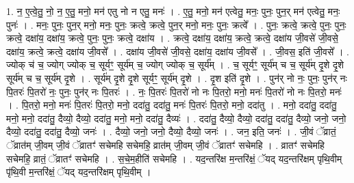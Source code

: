 \documentclass[17pt]{extarticle}
\begin{document}
1. न॒ ए॒त्वे॒तु॒ नो॒ न॒ ए॒तु॒ मनो॒ मन॑ एतु नो न एतु॒ मनः॑ । . ए॒तु॒ मनो॒ मन॑ एत्वेतु॒ मनः॒ पुनः॒ पुन॒र् मन॑ एत्वेतु॒ मनः॒ पुनः॑ । . मनः॒ पुनः॒ पुन॒र् मनो॒ मनः॒ पुनः॒ क्रत्वे॒ क्रत्वे॒ पुन॒र् मनो॒ मनः॒ पुनः॒ क्रत्वे᳚ । . पुनः॒ क्रत्वे॒ क्रत्वे॒ पुनः॒ पुनः॒ क्रत्वे॒ दक्षा॑य॒ दक्षा॑य॒ क्रत्वे॒ पुनः॒ पुनः॒ क्रत्वे॒ दक्षा॑य । . क्रत्वे॒ दक्षा॑य॒ दक्षा॑य॒ क्रत्वे॒ क्रत्वे॒ दक्षा॑य जी॒वसे॑ जी॒वसे॒ दक्षा॑य॒ क्रत्वे॒ क्रत्वे॒ दक्षा॑य जी॒वसे᳚ । . दक्षा॑य जी॒वसे॑ जी॒वसे॒ दक्षा॑य॒ दक्षा॑य जी॒वसे᳚ । . जी॒वस॒ इति॑ जी॒वसे᳚ । . ज्योक् च॑ च॒ ज्योग् ज्योक् च॒ सूर्यꣳ॒॒ सूर्य॑म् च॒ ज्योग् ज्योक् च॒ सूर्य᳚म् । . च॒ सूर्यꣳ॒॒ सूर्य॑म् च च॒ सूर्य॑म् दृ॒शे दृ॒शे सूर्य॑म् च च॒ सूर्य॑म् दृ॒शे । . सूर्य॑म् दृ॒शे दृ॒शे सूर्यꣳ॒॒ सूर्य॑म् दृ॒शे । . दृ॒श इति॑ दृ॒शे । . पुन॑र् नो नः॒ पुनः॒ पुन॑र् नः पि॒तरः॑ पि॒तरो॑ नः॒ पुनः॒ पुन॑र् नः पि॒तरः॑ । . नः॒ पि॒तरः॑ पि॒तरो॑ नो नः पि॒तरो॒ मनो॒ मनः॑ पि॒तरो॑ नो नः पि॒तरो॒ मनः॑ । . पि॒तरो॒ मनो॒ मनः॑ पि॒तरः॑ पि॒तरो॒ मनो॒ ददा॑तु॒ ददा॑तु॒ मनः॑ पि॒तरः॑ पि॒तरो॒ मनो॒ ददा॑तु । . मनो॒ ददा॑तु॒ ददा॑तु॒ मनो॒ मनो॒ ददा॑तु॒ दैव्यो॒ दैव्यो॒ ददा॑तु॒ मनो॒ मनो॒ ददा॑तु॒ दैव्यः॑ । . ददा॑तु॒ दैव्यो॒ दैव्यो॒ ददा॑तु॒ ददा॑तु॒ दैव्यो॒ जनो॒ जनो॒ दैव्यो॒ ददा॑तु॒ ददा॑तु॒ दैव्यो॒ जनः॑ । . दैव्यो॒ जनो॒ जनो॒ दैव्यो॒ दैव्यो॒ जनः॑ । . जन॒ इति॒ जनः॑ । . जी॒वं ॅव्रातं॒ ॅव्रात॑म् जी॒वम् जी॒वं ॅव्रातꣳ॑ सचेमहि सचेमहि॒ व्रात॑म् जी॒वम् जी॒वं ॅव्रातꣳ॑ सचेमहि । . व्रातꣳ॑ सचेमहि सचेमहि॒ व्रातं॒ ॅव्रातꣳ॑ सचेमहि । . स॒चे॒म॒हीति॑ सचेमहि । . यद॒न्तरि॑क्ष म॒न्तरि॑क्षं॒ ॅयद् यद॒न्तरि॑क्षम् पृथि॒वीम् पृ॑थि॒वी म॒न्तरि॑क्षं॒ ॅयद् यद॒न्तरि॑क्षम् पृथि॒वीम् । \newline
\end{document}
